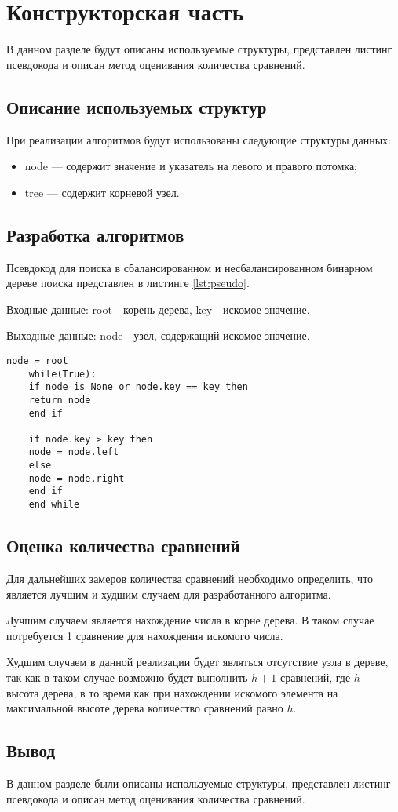 \chapter{Конструкторская часть}

В данном разделе будут описаны используемые структуры, представлен листинг псевдокода и описан метод оценивания количества сравнений.


\section{Описание используемых структур}
При реализации алгоритмов будут использованы следующие структуры данных:
\begin{itemize}
	\item node --- содержит значение и указатель на левого и правого потомка;
	\item tree --- содержит корневой узел.
\end{itemize}


\section{Разработка алгоритмов}

Псевдокод для поиска в сбалансированном и несбалансированном бинарном дереве поиска представлен в листинге \ref{lst:pseudo}.

Входные данные: root - корень дерева, key - искомое значение.
                
Выходные данные: node - узел, содержащий искомое значение.	
\begin{lstlisting}[label=lst:pseudo,caption=Псевдокод для поиска в бинарном дереве поиска]			
	node = root
	while(True):
	if node is None or node.key == key then
	return node
	end if
	
	if node.key > key then
	node = node.left
	else
	node = node.right
	end if
	end while
\end{lstlisting}

\section{Оценка количества сравнений}
Для дальнейших замеров количества сравнений необходимо определить, что является лучшим и худшим случаем для разработанного алгоритма.

Лучшим случаем является нахождение числа в корне дерева.
В таком случае потребуется 1 сравнение для нахождения искомого числа.

Худшим случаем в данной реализации будет являться отсутствие узла в дереве, так как в таком случае возможно будет выполнить $h + 1$ сравнений, где $h$ --- высота дерева, в то время как при нахождении искомого элемента на максимальной высоте дерева количество сравнений равно $h$.

\section*{Вывод}

В данном разделе были описаны используемые структуры, представлен листинг псевдокода и описан метод оценивания количества сравнений.